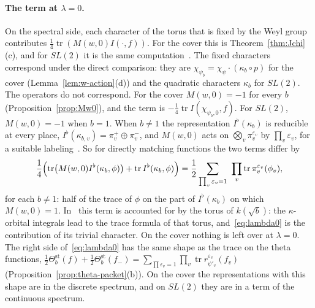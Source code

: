 \paragraph{The term at $\lambda=0$.} On the spectral side, each character of the torus that is fixed by the
Weyl group contributes $\frac14\operatorname{tr}(M(w,0)I(\cdot,f))$. For
the cover this is Theorem~\ref{thm:Jchi}(c), and for $SL(2)$ it is the
same computation~\cite{LL79,GJ79}. The fixed characters correspond under the
direct comparison: they are $\chi_{\psi_b}=\chi_\psi\cdot(\kappa_b\circ p)$
for the cover (Lemma~\ref{lem:w-action}(d)) and the quadratic characters
$\kappa_b$ for $SL(2)$. The operators do not correspond. For the cover
$M(w,0)=-1$ for every $b$ (Proposition~\ref{prop:Mw0}), and the term is
$-\frac14\operatorname{tr}I(\chi_{\psi_b,0},f)$. For $SL(2)$, $M(w,0)=-1$
when $b=1$. When $b\ne1$ the representation $I^\flat(\kappa_b)$ is
reducible at every place, $I^\flat(\kappa_{b,v})=\pi^+_v\oplus\pi^-_v$, and
$M(w,0)$ acts on $\bigotimes_v\pi_v^{\varepsilon_v}$ by
$\prod_v\varepsilon_v$, for a suitable labeling~\cite{LL79}. So for
directly matching functions the two terms differ by
\begin{equation}\label{eq:lambda0}
\frac14\Bigl(\operatorname{tr}\bigl(M(w,0)I^\flat(\kappa_b,\phi)\bigr)+
\operatorname{tr}I^\flat(\kappa_b,\phi)\Bigr)=\frac12\sum_{\prod_v
\varepsilon_v=1}\ \prod_v\operatorname{tr}\pi_v^{\varepsilon_v}(\phi_v),
\end{equation}
for each $b\ne1$: half of the trace of $\phi$ on the part of
$I^\flat(\kappa_b)$ on which $M(w,0)=1$. In~\cite{LL79} this term is
accounted for by the torus of $k(\sqrt b)$: the $\kappa$-orbital
integrals lead to the trace formula of that torus, and~\eqref{eq:lambda0}
is the contribution of its trivial character. On the cover
nothing is left over at $\lambda=0$. The right side of~\eqref{eq:lambda0}
has the same shape as the trace on the theta functions,
$\frac12\Theta^{\mathrm{st}}_b(f)+\frac12\Theta^{\mathrm{st}}_b(f_-)=\sum_{
\prod\varepsilon_v=1}\prod_v\operatorname{tr}r^{\varepsilon_v}_{\psi'_v}(f_v)$
(Proposition~\ref{prop:theta-packet}(b)). On the cover the representations
with this shape are in the discrete spectrum, and on $SL(2)$ they are in
a term of the continuous spectrum.

